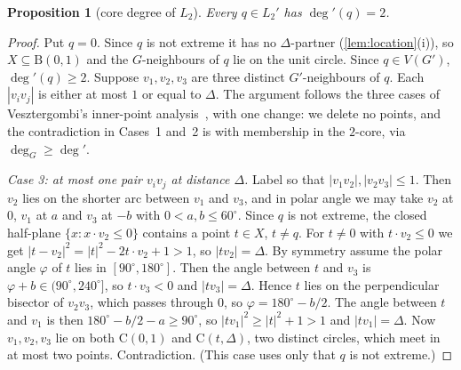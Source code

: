\documentclass[11pt]{amsart}
\newtheorem{proposition}[theorem]{Proposition}
\theoremstyle{definition}
\theoremstyle{remark}
\newcommand{\Cc}{\mathrm{C}}      %
\newcommand{\Dd}{\mathrm{B}}      %
\begin{document}
\begin{proposition}[core degree of $L_2$]\label{prop:core2}
Every $q\in L_2'$ has $\deg'(q)=2$.
\end{proposition}
\begin{proof}
Put $q=0$. Since $q$ is not extreme it has no $\Delta$-partner (\cref{lem:location}(i)), so $X\subseteq\Dd(0,1)$ and the $G$-neighbours of $q$ lie on the unit circle. Since $q\in V(G')$, $\deg'(q)\ge2$. Suppose $v_1,v_2,v_3$ are three distinct $G'$-neighbours of $q$. Each $|v_iv_j|$ is either at most $1$ or equal to $\Delta$. The argument follows the three cases of Vesztergombi's inner-point analysis~\cite[pp.~192--194]{Ve87}, with one change: we delete no points, and the contradiction in Cases~1 and~2 is with membership in the $2$-core, via $\deg_G\ge\deg'$.

\emph{Case 3: at most one pair $v_iv_j$ at distance $\Delta$.} Label so that $|v_1v_2|,|v_2v_3|\le1$. Then $v_2$ lies on the shorter arc between $v_1$ and $v_3$, and in polar angle we may take $v_2$ at $0$, $v_1$ at $a$ and $v_3$ at $-b$ with $0<a,b\le60^\circ$. Since $q$ is not extreme, the closed half-plane $\{x:x\cdot v_2\le0\}$ contains a point $t\in X$, $t\ne q$. For $t\ne0$ with $t\cdot v_2\le0$ we get $|t-v_2|^2=|t|^2-2t\cdot v_2+1>1$, so $|tv_2|=\Delta$. By symmetry assume the polar angle $\varphi$ of $t$ lies in $[90^\circ,180^\circ]$. Then the angle between $t$ and $v_3$ is $\varphi+b\in(90^\circ,240^\circ]$, so $t\cdot v_3<0$ and $|tv_3|=\Delta$. Hence $t$ lies on the perpendicular bisector of $v_2v_3$, which passes through $0$, so $\varphi=180^\circ-b/2$. The angle between $t$ and $v_1$ is then $180^\circ-b/2-a\ge90^\circ$, so $|tv_1|^2\ge|t|^2+1>1$ and $|tv_1|=\Delta$. Now $v_1,v_2,v_3$ lie on both $\Cc(0,1)$ and $\Cc(t,\Delta)$, two distinct circles, which meet in at most two points. Contradiction. (This case uses only that $q$ is not extreme.)


\end{proof}
\end{document}

